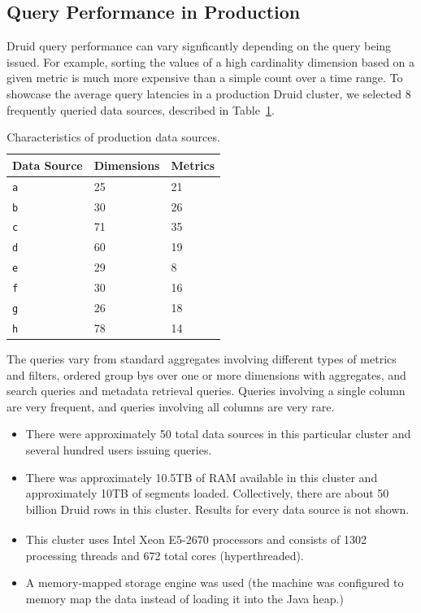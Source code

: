 \documentclass{vldb}
\begin{document}
\subsection{Query Performance in Production}
Druid query performance can vary signficantly depending on the query being
issued. For example, sorting the values of a high cardinality dimension based
on a given metric is much more expensive than a simple count over a time range.
To showcase the average query latencies in a production Druid cluster, we
selected 8 frequently queried data sources, described in
Table~\ref{tab:datasources}.

\begin{table}
  \centering
  \scriptsize\begin{tabular}{| l | l | l |}
    \hline
    \textbf{Data Source} & \textbf{Dimensions} & \textbf{Metrics} \\ \hline
    \texttt{a} & 25 & 21 \\ \hline
    \texttt{b} & 30 & 26 \\ \hline
    \texttt{c} & 71 & 35 \\ \hline
    \texttt{d} & 60 & 19 \\ \hline
    \texttt{e} & 29 & 8 \\ \hline
    \texttt{f} & 30 & 16 \\ \hline
    \texttt{g} & 26 & 18 \\ \hline
    \texttt{h} & 78 & 14 \\ \hline
  \end{tabular}
  \normalsize
  \caption{Characteristics of production data sources.}
  \label{tab:datasources}
\end{table}

The queries vary from standard aggregates involving different types
of metrics and filters, ordered group bys over one or more
dimensions with aggregates, and search queries and metadata
retrieval queries. Queries involving a single column are very
frequent, and queries involving all columns are very rare.

\begin{itemize}[leftmargin=*,beginpenalty=5000,topsep=0pt]
\item There were
approximately 50 total data sources in this particular cluster and several hundred users issuing
queries.

\item There was approximately 10.5TB of RAM available in this cluster and
approximately 10TB of segments loaded. Collectively,
there are about 50 billion Druid rows in this cluster. Results for
every data source is not shown.

\item This cluster uses Intel\textsuperscript{\textregistered} Xeon\textsuperscript{\textregistered} E5-2670 processors and consists of 1302 processing
threads and 672 total cores (hyperthreaded).

\item A memory-mapped storage engine was used (the machine was configured to
    memory map the data instead of loading it into the Java heap.)
\end{itemize}
\end{document}
